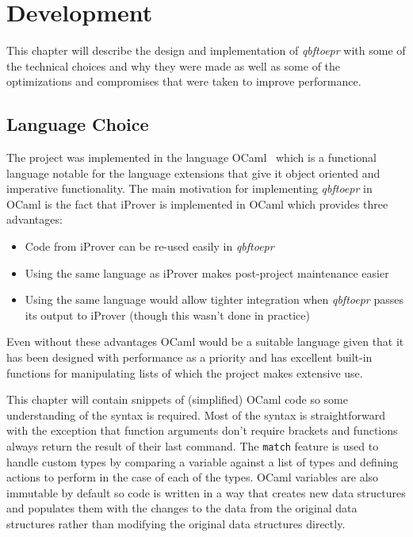 \chapter{Development}
This chapter will describe the design and implementation of \textit{qbftoepr} with some of the technical choices and why they were made as well as some of the optimizations and compromises that were taken to improve performance.

\section{Language Choice}
The project was implemented in the language OCaml~\cite{ocaml} which is a functional language notable for the language extensions that give it object oriented and imperative functionality. The main motivation for implementing \textit{qbftoepr} in OCaml is the fact that iProver is implemented in OCaml which provides three advantages:

\begin{itemize}
\item Code from iProver can be re-used easily in \textit{qbftoepr}\\
\item Using the same language as iProver makes post-project maintenance easier\\
\item Using the same language would allow tighter integration when \textit{qbftoepr} passes its output to iProver (though this wasn't done in practice)\\
\end{itemize}

Even without these advantages OCaml would be a suitable language given that it has been designed with performance as a priority and has excellent built-in functions for manipulating lists of which the project makes extensive use.

This chapter will contain snippets of (simplified) OCaml code so some understanding of the syntax is required. Most of the syntax is straightforward with the exception that function arguments don't require brackets and functions always return the result of their last command. The \texttt{match} feature is used to handle custom types by comparing a variable against a list of types and defining actions to perform in the case of each of the types. OCaml variables are also immutable by default so code is written in a way that creates new data structures and populates them with the changes to the data from the original data structures rather than modifying the original data structures directly.


